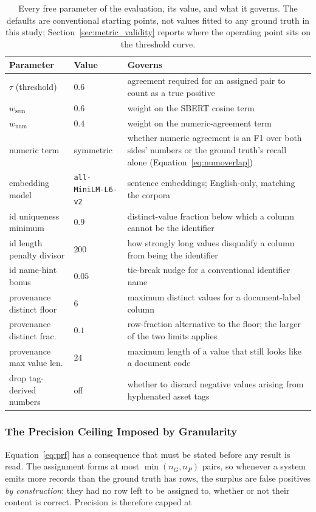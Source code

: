 \documentclass[11pt]{article}
\begin{document}
\begin{table}[H]
\centering
\caption{Every free parameter of the evaluation, its value, and what it governs.
The defaults are conventional starting points, not values fitted to any ground
truth in this study; Section~\ref{sec:metric_validity} reports where the
operating point sits on the threshold curve.}
\label{tab:free_params}
\small
\begin{tabular}{@{}llp{}@{}}
\toprule
\textbf{Parameter} & \textbf{Value} & \textbf{Governs} \\
\midrule
$\tau$ (threshold)        & $0.6$   & agreement required for an assigned pair to count as a true positive \\
$w_{\text{sem}}$          & $0.6$   & weight on the SBERT cosine term \\
$w_{\text{num}}$          & $0.4$   & weight on the numeric-agreement term \\
numeric term              & symmetric & whether numeric agreement is an F1 over both sides' numbers or the ground truth's recall alone (Equation~\ref{eq:numoverlap}) \\
embedding model           & \texttt{all-MiniLM-L6-v2} & sentence embeddings; English-only, matching the corpora \\
id uniqueness minimum     & $0.9$   & distinct-value fraction below which a column cannot be the identifier \\
id length penalty divisor & $200$   & how strongly long values disqualify a column from being the identifier \\
id name-hint bonus        & $0.05$  & tie-break nudge for a conventional identifier name \\
provenance distinct floor & $6$     & maximum distinct values for a document-label column \\
provenance distinct frac. & $0.1$   & row-fraction alternative to the floor; the larger of the two limits applies \\
provenance max value len. & $24$    & maximum length of a value that still looks like a document code \\
drop tag-derived numbers  & off     & whether to discard negative values arising from hyphenated asset tags \\
\bottomrule
\end{tabular}
\end{table}

\subsubsection{The Precision Ceiling Imposed by Granularity}
\label{sec:granularity}
Equation~\ref{eq:prf} has a consequence that must be stated before any result is
read. The assignment forms at most $\min(n_G, n_P)$ pairs, so whenever a system
emits more records than the ground truth has rows, the surplus are false
positives \emph{by construction}: they had no row left to be assigned to,
whether or not their content is correct. Precision is therefore capped at
\end{document}
